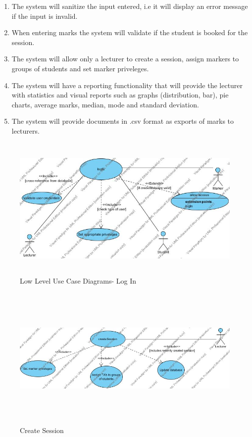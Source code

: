 \documentclass[a4paper]{article}
\begin{document}
\begin{enumerate}
		\item The system will sanitize the input entered, i.e it will display an error message if the input is invalid.
		\item When entering marks the system will validate if the student is booked for the session.
		\item The system will allow only a lecturer to create a session, assign markers to groups of students and set marker priveleges.
		\item The system will have a reporting functionality that will provide the lecturer with statistics and visual reports such as graphs (distribution, bar), pie charts, average marks, median, mode and standard deviation. 
		\item The system will provide documents in .csv format as exports of marks to lecturers.
		
		\end{enumerate}
			\begin{figure}[h]
				\caption{Low Level Use Case Diagrams- Log In}
				\includegraphics[height=7cm]{logIn}
			\end{figure}
			\begin{figure}[h]
				\caption{Create Session}
				\includegraphics[height=7cm]{createSession}
			\end{figure}
\end{document}
